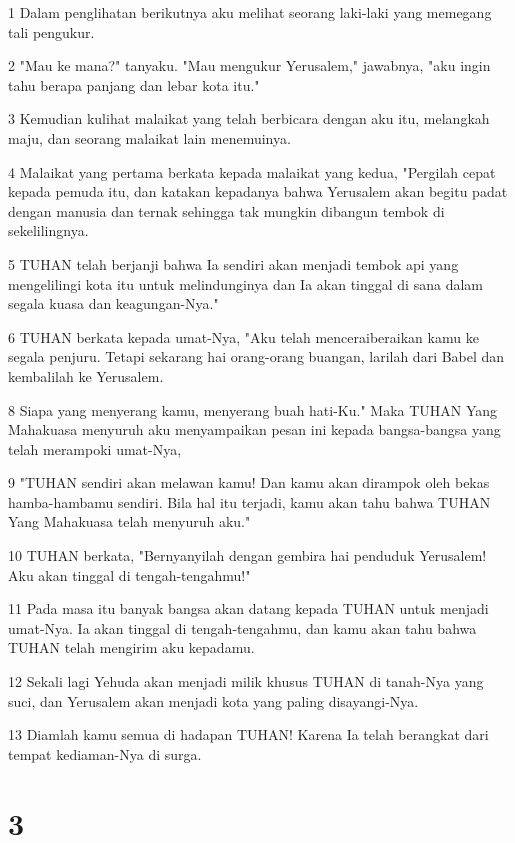 \par 1 Dalam penglihatan berikutnya aku melihat seorang laki-laki yang memegang tali pengukur.
\par 2 "Mau ke mana?" tanyaku. "Mau mengukur Yerusalem," jawabnya, "aku ingin tahu berapa panjang dan lebar kota itu."
\par 3 Kemudian kulihat malaikat yang telah berbicara dengan aku itu, melangkah maju, dan seorang malaikat lain menemuinya.
\par 4 Malaikat yang pertama berkata kepada malaikat yang kedua, "Pergilah cepat kepada pemuda itu, dan katakan kepadanya bahwa Yerusalem akan begitu padat dengan manusia dan ternak sehingga tak mungkin dibangun tembok di sekelilingnya.
\par 5 TUHAN telah berjanji bahwa Ia sendiri akan menjadi tembok api yang mengelilingi kota itu untuk melindunginya dan Ia akan tinggal di sana dalam segala kuasa dan keagungan-Nya."
\par 6 TUHAN berkata kepada umat-Nya, "Aku telah menceraiberaikan kamu ke segala penjuru. Tetapi sekarang hai orang-orang buangan, larilah dari Babel dan kembalilah ke Yerusalem.
\par 8 Siapa yang menyerang kamu, menyerang buah hati-Ku." Maka TUHAN Yang Mahakuasa menyuruh aku menyampaikan pesan ini kepada bangsa-bangsa yang telah merampoki umat-Nya,
\par 9 "TUHAN sendiri akan melawan kamu! Dan kamu akan dirampok oleh bekas hamba-hambamu sendiri. Bila hal itu terjadi, kamu akan tahu bahwa TUHAN Yang Mahakuasa telah menyuruh aku."
\par 10 TUHAN berkata, "Bernyanyilah dengan gembira hai penduduk Yerusalem! Aku akan tinggal di tengah-tengahmu!"
\par 11 Pada masa itu banyak bangsa akan datang kepada TUHAN untuk menjadi umat-Nya. Ia akan tinggal di tengah-tengahmu, dan kamu akan tahu bahwa TUHAN telah mengirim aku kepadamu.
\par 12 Sekali lagi Yehuda akan menjadi milik khusus TUHAN di tanah-Nya yang suci, dan Yerusalem akan menjadi kota yang paling disayangi-Nya.
\par 13 Diamlah kamu semua di hadapan TUHAN! Karena Ia telah berangkat dari tempat kediaman-Nya di surga.

\chapter{3}

